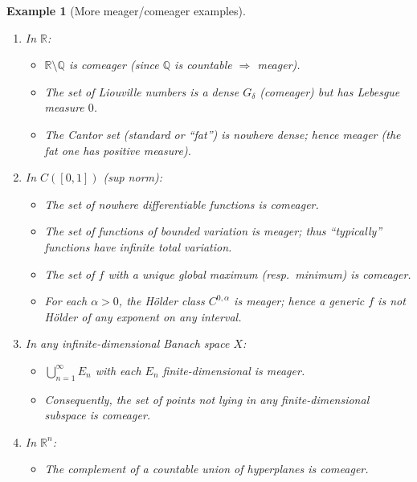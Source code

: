 \documentclass[11pt,a4paper]{article}
\newtheorem{example}{Example}
\theoremstyle{definition}
\theoremstyle{definition}
\theoremstyle{plain}
\theoremstyle{remark}
\begin{document}
\begin{example}[More meager/comeager examples]
	\leavevmode
	\begin{enumerate}
		\item In $\mathbb R$:
		\begin{itemize}
			\item $\mathbb R\setminus\mathbb Q$ is comeager (since $\mathbb Q$ is countable $\Rightarrow$ meager).
			\item The set of Liouville numbers is a dense $G_\delta$ (comeager) but has Lebesgue measure $0$.
			\item The Cantor set (standard or “fat”) is nowhere dense; hence meager (the fat one has positive measure).
		\end{itemize}
		\item In $C([0,1])$ (sup norm):
		\begin{itemize}
			\item The set of nowhere differentiable functions is comeager.
			\item The set of functions of bounded variation is meager; thus “typically” functions have infinite total variation.
			\item The set of $f$ with a unique global maximum (resp.\ minimum) is comeager.
			\item For each $\alpha>0$, the Hölder class $C^{0,\alpha}$ is meager; hence a generic $f$ is not Hölder of any exponent on any interval.
		\end{itemize}
		\item In any infinite-dimensional Banach space $X$:
		\begin{itemize}
			\item $\bigcup_{n=1}^\infty E_n$ with each $E_n$ finite-dimensional is meager.
			\item Consequently, the set of points not lying in any finite-dimensional subspace is comeager.
		\end{itemize}
		\item In $\mathbb R^n$:
		\begin{itemize}
			\item The complement of a countable union of hyperplanes is comeager.
		\end{itemize}
	\end{enumerate}
\end{example}




\end{document}
